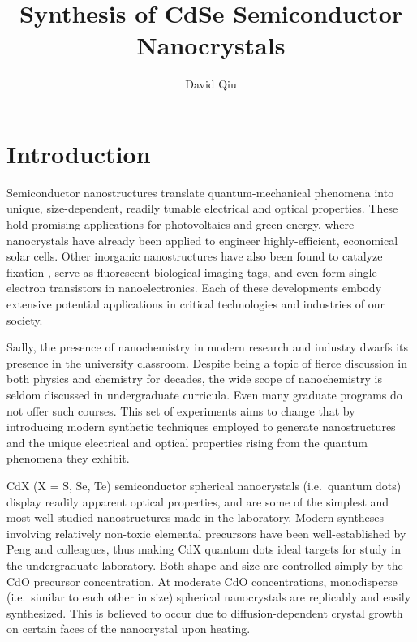 \documentclass[journal = jceda8, manuscript = article]{achemso}
\title{Synthesis of CdSe Semiconductor Nanocrystals}
\author{David Qiu}
\affiliation{Department of Chemistry, University of Illinois at
Urbana-Champaign, 505 S Matthews Avenue, Urbana, IL, 61801}
\begin{document}
\section{Introduction}


Semiconductor nanostructures translate quantum-mechanical phenomena into unique,
size-dependent, readily tunable electrical and optical
properties.\cite{nano_rev} These hold promising applications for photovoltaics
and green energy, where nanocrystals have already been applied to engineer
highly-efficient, economical solar cells. \cite{solar_1, solar_2, solar_3} Other
inorganic nanostructures have also been found to catalyze  fixation
\cite{co2_1, co2_2}, serve as fluorescent biological imaging tags, \cite{bio_1,
bio_2} and even form single-electron transistors in nanoelectronics.
\cite{nano_elec} Each of these developments embody extensive potential
applications in critical technologies and industries of our society.

Sadly, the presence of nanochemistry in modern research and industry dwarfs its
presence in the university classroom. Despite being a topic of fierce discussion
in both physics and chemistry for decades, the wide scope of nanochemistry is
seldom discussed in undergraduate curricula. Even many graduate programs do not
offer such courses. This set of experiments aims to change that by introducing
modern synthetic techniques employed to generate nanostructures and the unique
electrical and optical properties rising from the quantum phenomena they
exhibit.

CdX (X = S, Se, Te) semiconductor spherical nanocrystals (i.e.\ quantum dots)
display readily apparent optical properties, and are some of the simplest and
most well-studied nanostructures made in the laboratory. Modern syntheses
involving relatively non-toxic elemental precursors have been well-established
by Peng and colleagues, thus making CdX quantum dots ideal targets for study in
the undergraduate laboratory. \cite{peng_1, peng_2} Both shape and size are
controlled simply by the CdO precursor concentration.  At moderate CdO
concentrations, monodisperse (i.e.\ similar to each other in size) spherical
nanocrystals are replicably and easily synthesized.  This is believed to occur
due to diffusion-dependent crystal growth on certain faces of the nanocrystal
upon heating. \cite{peng_mechanism}
\end{document}
